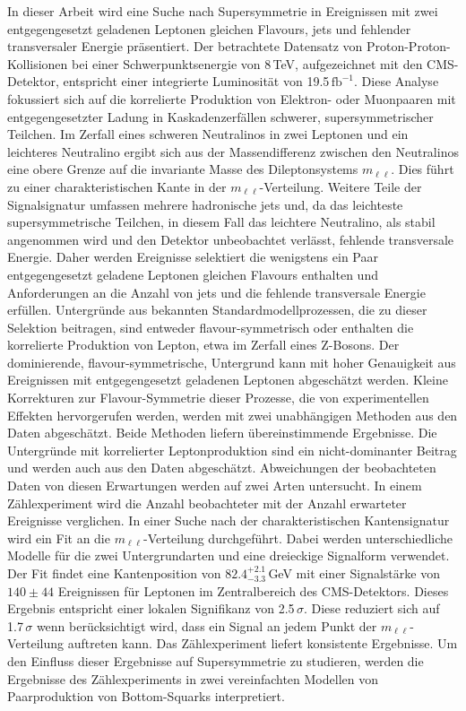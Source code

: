 In dieser Arbeit wird eine Suche nach Supersymmetrie in Ereignissen mit zwei entgegengesetzt geladenen Leptonen gleichen Flavours, jets und fehlender transversaler Energie pr\"asentiert. Der betrachtete Datensatz von Proton-Proton-Kollisionen bei einer Schwerpunktsenergie von 8\,TeV, aufgezeichnet mit den CMS-Detektor, entspricht einer integrierte Luminosit\"at von 19.5\,$\mathrm{fb}^{-1}$. Diese Analyse fokussiert sich auf die korrelierte Produktion von Elektron- oder Muonpaaren mit entgegengesetzter Ladung in Kaskadenzerf\"allen schwerer, supersymmetrischer Teilchen. Im Zerfall eines schweren Neutralinos in zwei Leptonen und ein leichteres Neutralino ergibt sich aus der Massendifferenz zwischen den Neutralinos eine obere Grenze auf die invariante Masse des Dileptonsystems $m_{\ell\ell}$. Dies f\"uhrt zu einer charakteristischen Kante in der $m_{\ell\ell}$-Verteilung. Weitere Teile der Signalsignatur umfassen mehrere hadronische jets und, da das leichteste supersymmetrische Teilchen, in diesem Fall das leichtere Neutralino, als stabil angenommen wird und den Detektor unbeobachtet verl\"asst, fehlende transversale Energie. Daher werden Ereignisse selektiert die wenigstens ein Paar entgegengesetzt geladene Leptonen gleichen Flavours enthalten und Anforderungen an die Anzahl von jets und die fehlende transversale Energie erf\"ullen. Untergr\"unde aus bekannten Standardmodellprozessen, die zu dieser Selektion beitragen, sind entweder flavour-symmetrisch oder enthalten die korrelierte Produktion von Lepton, etwa im Zerfall eines $\mathrm{Z}$-Bosons. Der dominierende, flavour-symmetrische, Untergrund kann mit hoher Genauigkeit aus Ereignissen mit entgegengesetzt geladenen Leptonen abgesch\"atzt werden. Kleine Korrekturen zur Flavour-Symmetrie dieser Prozesse, die von experimentellen Effekten hervorgerufen werden, werden mit zwei unabh\"angigen Methoden aus den Daten abgesch\"atzt. Beide Methoden liefern \"ubereinstimmende Ergebnisse. Die Untergr\"unde mit korrelierter Leptonproduktion sind ein nicht-dominanter Beitrag und werden auch aus den Daten abgesch\"atzt. Abweichungen der beobachteten Daten von diesen Erwartungen werden auf zwei Arten untersucht. In einem Z\"ahlexperiment wird die Anzahl beobachteter mit der Anzahl erwarteter Ereignisse verglichen. In einer Suche nach der charakteristischen Kantensignatur wird ein Fit an die $m_{\ell\ell}$-Verteilung durchgef\"uhrt. Dabei werden unterschiedliche Modelle f\"ur die zwei Untergrundarten und eine dreieckige Signalform verwendet. Der Fit findet eine Kantenposition von $82.4^{+2.1}_{-3.3}$\,GeV mit einer Signalst\"arke von $140\pm44$ Ereignissen für Leptonen im Zentralbereich des CMS-Detektors. Dieses Ergebnis entspricht einer lokalen Signifikanz von 2.5\,$\sigma$. Diese reduziert sich auf 1.7\,$\sigma$ wenn ber\"ucksichtigt wird, dass ein Signal an jedem Punkt der $m_{\ell\ell}$-Verteilung auftreten kann. Das Z\"ahlexperiment liefert konsistente Ergebnisse. Um den Einfluss dieser Ergebnisse auf Supersymmetrie zu studieren, werden die Ergebnisse des Z\"ahlexperiments in zwei vereinfachten Modellen von Paarproduktion von Bottom-Squarks interpretiert. 
